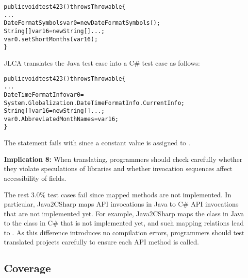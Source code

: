 \begin{CodeOut}%
\begin{alltt}
public void test423() throws Throwable\{
  ...
  DateFormatSymbols var0=new DateFormatSymbols();
  String[] var16=new String[]{...};
  var0.setShortMonths(var16);
\}
\end{alltt}
\end{CodeOut}

JLCA translates the Java test case into a C\# test case as follows:

\begin{CodeOut}%
\begin{alltt}
public void test423() throws Throwable\{
  ...
  DateTimeFormatInfo var0 =
  System.Globalization.DateTimeFormatInfo.CurrentInfo;
  String[] var16=new String[]{...};
  var0.AbbreviatedMonthNames = var16;
\}
\end{alltt}
\end{CodeOut}

The  statement fails with  since a constant value is assigned to .

\textbf{Implication 8:} When translating, programmers should check carefully whether they violate speculations of libraries and whether invocation sequences affect accessibility of fields.

The rest 3.0\% test cases fail since mapped methods are not implemented. In particular, Java2CSharp maps API invocations in Java to C\# API invocations that are not implemented yet. For example, Java2CSharp maps the  class in Java to the  class in C\# that is not implemented yet, and such mapping relations lead to . As this difference introduces no compilation errors, programmers should test translated projects carefully to ensure each API method is called.
\subsection{Coverage}
\label{sec:evaluation:coverage}

